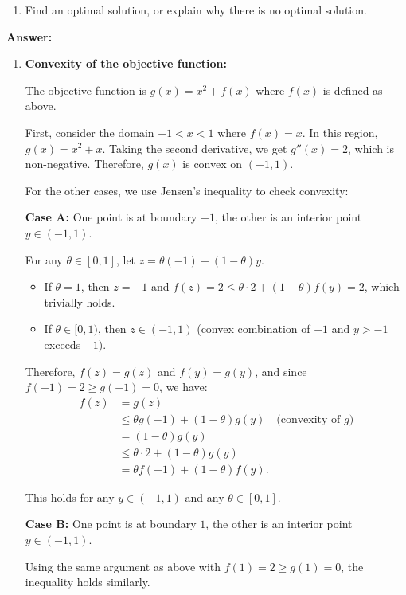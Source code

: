 \documentclass{article}
\begin{document}
\begin{enumerate}
\begin{enumerate}
    \item Find an optimal solution, or explain why there is no optimal solution.  
\end{enumerate}

\textbf{Answer:}

\begin{enumerate}
    \item \textbf{Convexity of the objective function:}
    
    The objective function is $g(x) = x^2 + f(x)$ where $f(x)$ is defined as above.
    
    First, consider the domain $-1 < x < 1$ where $f(x) = x$. In this region, $g(x) = x^2 + x$. Taking the second derivative, we get $g''(x) = 2$, which is non-negative. Therefore, $g(x)$ is convex on $(-1, 1)$.
    
    For the other cases, we use Jensen's inequality to check convexity:
    
    \textbf{Case A:} One point is at boundary $-1$, the other is an interior point $y \in (-1,1)$.
    
    For any $\theta \in [0,1]$, let $z = \theta(-1) + (1-\theta)y$.
    \begin{itemize}
        \item If $\theta = 1$, then $z = -1$ and $f(z) = 2 \leq \theta \cdot 2 + (1-\theta)f(y) = 2$, which trivially holds.
        \item If $\theta \in [0,1)$, then $z \in (-1,1)$ (convex combination of $-1$ and $y > -1$ exceeds $-1$).
    \end{itemize}
    
    Therefore, $f(z) = g(z)$ and $f(y) = g(y)$, and since $f(-1) = 2 \geq g(-1) = 0$, we have:
    \begin{align}
    f(z) &= g(z) \\
    &\leq \theta g(-1) + (1-\theta)g(y) \quad \text{(convexity of } g\text{)} \\
    &= (1-\theta)g(y) \\
    &\leq \theta \cdot 2 + (1-\theta)g(y) \\
    &= \theta f(-1) + (1-\theta)f(y).
    \end{align}
    
    This holds for any $y \in (-1,1)$ and any $\theta \in [0,1]$.
    
    \textbf{Case B:} One point is at boundary $1$, the other is an interior point $y \in (-1,1)$.
    
    Using the same argument as above with $f(1) = 2 \geq g(1) = 0$, the inequality holds similarly.
    

\end{enumerate}
\end{enumerate}
\end{document}
